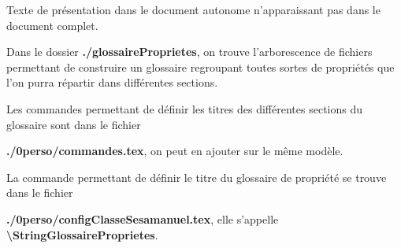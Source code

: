 \documentclass[nocrop]{\persopath/sesamanuel}
\begin{document}
Texte de présentation dans le document autonome n'apparaissant pas dans le document complet.

\medskip

Dans le dossier \textbf{./glossaireProprietes}, on trouve l'arborescence de fichiers permettant de construire un glossaire
regroupant toutes sortes de propriétés que l'on purra répartir dans différentes sections.

\medskip

Les commandes permettant de définir les titres des différentes sections du glossaire sont dans le fichier
\par \textbf{./0perso/commandes.tex}, on peut en ajouter sur le même modèle.

\medskip

La commande permettant de définir le titre du glossaire de propriété se trouve dans le fichier
\par \textbf{./0perso/configClasseSesamanuel.tex}, elle s'appelle \textbf{\textbackslash StringGlossaireProprietes}.


\end{document}
